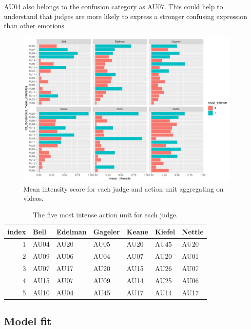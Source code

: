 \documentclass{monashthesis}
\begin{document}
AU04 also belongs to the confusion category as AU07. This could help to understand that judges are more likely to express a stronger confusing expression than other emotions.

\begin{figure}

{\centering \includegraphics[width=1\linewidth]{figures/unnamed-chunk-16-1} 

}

\caption{Mean intensity score for each judge and action unit aggregating on videos.\label{fig:mean_intensity}}\label{fig:unnamed-chunk-16}
\end{figure}

\begin{table}

\caption{\label{tab:unnamed-chunk-17}\label{tab:most_intense}The five most intense action unit for each judge.}
\centering
\begin{tabular}[t]{r|l|l|l|l|l|l}
\hline
index & Bell & Edelman & Gageler & Keane & Kiefel & Nettle\\
\hline
1 & AU04 & AU20 & AU05 & AU20 & AU45 & AU20\\
\hline
2 & AU09 & AU06 & AU04 & AU07 & AU20 & AU01\\
\hline
3 & AU07 & AU17 & AU20 & AU15 & AU26 & AU07\\
\hline
4 & AU15 & AU07 & AU09 & AU14 & AU25 & AU06\\
\hline
5 & AU10 & AU04 & AU45 & AU17 & AU14 & AU17\\
\hline
\end{tabular}
\end{table}

\hypertarget{model-fit}{%
\subsection{Model fit}\label{model-fit}}
\end{document}
